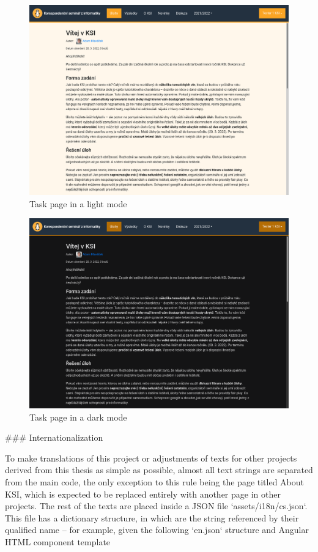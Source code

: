 \documentclass[
  digital, %
  oneside, %
  lof,     %
  nolot,     %
]{fithesis4}
\begin{document}
{\begin{figure}
\includegraphics[width=.8\textwidth]{assets/img/light-mode}
\caption{Task page in a light mode}
\label{fig:light-mode}
\end{figure}

\begin{figure}
\includegraphics[width=.8\textwidth]{assets/img/dark-mode}
\caption{Task page in a dark mode}
\label{fig:dark-mode}
\end{figure}

### Internationalization
\label{chap:translations}

To make translations of this project or adjustments of texts for other projects derived from this thesis as simple as possible, almost all text strings are separated from the main code, the only exception to this rule being the page titled About \acrshort{KSI}, which is expected to be replaced entirely with another page in other projects. The rest of the texts are placed inside a \acrshort{JSON} file `assets/i18n/cs.json`. This file has a dictionary structure, in which are the string referenced by their qualified name -- for example, given the following `en.json` structure and Angular \acrshort{HTML} component template

}
\end{document}
